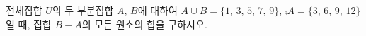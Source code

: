 전체집합 $U$의 두 부분집합 $A$, $B$에 대하여 $A\cup B=\{1,\,3,\,5,\,7,\,9\}$, $\comp{A}=\{3,\,6,\,9,\,12\}$일 때, 집합 $B-A$의 모든 원소의 합을 구하시오.

